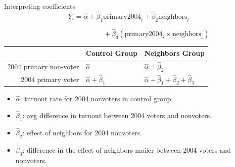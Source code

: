 \documentclass[
  ignorenonframetext,
]{beamer}
\providecommand{\tightlist}{%
  \setlength{\itemsep}{0pt}\setlength{\parskip}{0pt}}
\begin{document}
\begin{frame}{Interpreting coefficients}
\label{interpreting-coefficients}
\[
\hat{Y}_i = \hat{\alpha} + \hat{\beta}_1\text{primary2004}_i + \hat{\beta}_2 \text{neighbors}_i 
\]

\[
\qquad \qquad \qquad \qquad + \hat{\beta}_3 (\text{primary2004}_i \times \text{neighbors}_i)
\] \pause 

\begin{center}
\begin{tabular}{ r | l  l }
 & Control Group & Neighbors Group \\
\hline
2004 primary non-voter  & $\hat{\alpha}$ & $\hat{\alpha} + \hat{\beta}_2  $ \\
2004 primary voter  & $\hat{\alpha} + \hat{\beta}_1$ & $\hat{\alpha} + \hat{\beta}_1 + \hat{\beta}_2 + \hat{\beta}_3$ \\
\end{tabular}
\end{center}
\pause

\begin{itemize}
\tightlist
\item
  \(\hat{\alpha}\): turnout rate for 2004 nonvoters in control group.
  \pause 
\item
  \(\hat{\beta}_1\): avg difference in turnout between 2004 voters and
  nonvoters. \pause 
\item
  \(\hat{\beta}_2\): effect of neighbors for 2004 nonvoters. \pause 
\item
  \(\hat{\beta}_3\): difference in the effect of neighbors mailer
  between 2004 voters and nonvoters.
\end{itemize}
\end{frame}
\end{document}
